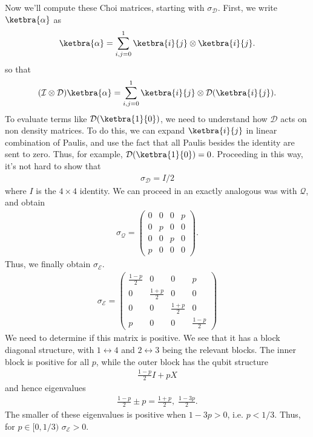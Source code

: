 \documentclass{book}
\begin{document}
    Now we'll compute these Choi matrices, starting with $\sigma_\mathcal{D}$. First, we write $\ketbra{\alpha}$ as 
    \begin{align}
        \ketbra{\alpha} = \sum_{i,j=0}^1 \ketbra{i}{j} \otimes \ketbra{i}{j}.
    \end{align}
    so that
    \begin{align}
        (\mathcal{I} \otimes \mathcal{D}) \ketbra{\alpha} = \sum_{i,j=0}^1 \ketbra{i}{j} \otimes \mathcal{D}(\ketbra{i}{j}).
    \end{align}
    To evaluate terms like $\mathcal{D}(\ketbra{1}{0})$, we need to understand how $\mathcal{D}$ acts on non density matrices. To do this, we can expand $\ketbra{i}{j}$ in linear combination of Paulis, and use the fact that all Paulis besides the identity are sent to zero. Thus, for example, $\mathcal{D}(\ketbra{1}{0}) = 0$. Proceeding in this way, it's not hard to show that
    \begin{align}
        \sigma_\mathcal{D} = I/2
    \end{align}
    where $I$ is the $4\times 4$ identity. We can proceed in an exactly analogous was with $\mathcal{Q}$, and obtain
    \begin{align}
        \sigma_\mathcal{Q} = \begin{pmatrix}
            0 & 0 & 0 & p \\
            0 & p & 0 & 0 \\
            0 & 0 & p & 0 \\
            p & 0 & 0 & 0
        \end{pmatrix}.
    \end{align}
    Thus, we finally obtain $\sigma_\mathcal{E}$.
    \begin{align}
        \sigma_\mathcal{E} = \begin{pmatrix}
            \frac{1-p}{2} & 0 & 0 & p \\
            0 & \frac{1+p}{2} & 0 & 0 \\
            0 & 0 & \frac{1+p}{2} & 0 \\
            p & 0 & 0 & \frac{1-p}{2}
        \end{pmatrix}
    \end{align}
    We need to determine if this matrix is positive. We see that it has a block diagonal structure, with $1 \leftrightarrow 4$ and $2 \leftrightarrow 3$ being the relevant blocks. The inner block is positive for all $p$, while the outer block has the qubit structure
    \begin{align}
        \frac{1-p}{2} I + p X
    \end{align}
    and hence eigenvalues
    \begin{align}
        \frac{1-p}{2} \pm p = \frac{1+p}{2},\; \frac{1-3p}{2}.
    \end{align}
    The smaller of these eigenvalues is positive when $1 - 3p > 0$, i.e. $p<1/3$. Thus, for $p \in [0,1/3)$ $\sigma_\mathcal{E} >0$.
\end{document}
